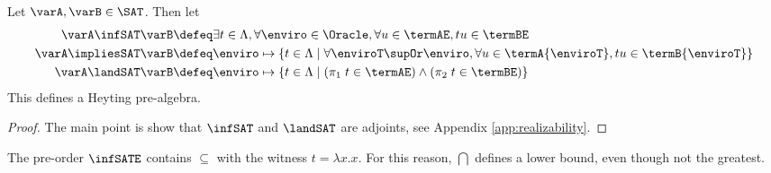 \begin{proposition}
\label{prop:SAT}
  Let $\varA,\varB \in \SAT$. Then let
  \begin{align*}
    \varA \infSAT \varB &\defeq \exists t \in \Lambda, \forall \enviro \in \Oracle, \forall u \in \termAE, tu \in \termBE\\
    \varA \impliesSAT \varB &\defeq \enviro \mapsto \{ t \in \Lambda \mid \forall \enviroT \supOr \enviro, \forall u \in \termA{\enviroT}, tu \in \termB{\enviroT}\}\\
    \varA\landSAT\varB &\defeq \enviro \mapsto \{ t \in \Lambda \mid (\pi_1\;t\in \termAE) \land (\pi_2\;t \in \termBE)\}
  \end{align*}
  This defines a Heyting pre-algebra.
\end{proposition}
\begin{proof}
 The main point is show that $\infSAT$ and $\landSAT$ are adjoints, see Appendix \ref{app:realizability}.
\end{proof}

\begin{remark}\label{rmk:inclusion}
  The pre-order $\infSATE$ contains $\subseteq$ with the witness $t = \lambda x.x$. For this reason, $\bigcap$ defines a lower bound, even though not the greatest.
\end{remark}


